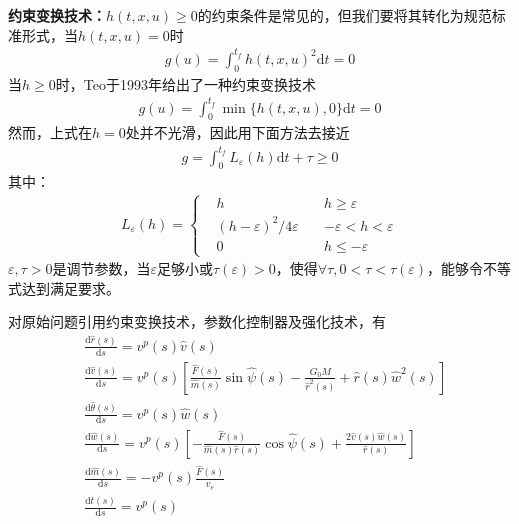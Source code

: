             \par
            \textbf{约束变换技术：}$h(t,x,u) \geqslant 0$的约束条件是常见的，但我们要将其转化为规范标准形式，当$h(t,x,u) = 0$时
            \begin{align*}
            g(u) = \int_0^{t_f}h(t,x,u)^2\mathrm{d}t = 0
            \end{align*}
            当$h \geqslant 0$时，Teo于1993年给出了一种约束变换技术
            \begin{align*}
            g(u) = \int_{0}^{t_f}\min\{h(t,x,u),0\}\mathrm{d}t =0
            \end{align*}
            然而，上式在$h=0$处并不光滑，因此用下面方法去接近
            \begin{align*}
            g = \int_{0}^{t_f} L_\varepsilon(h)\mathrm{d}t+\tau \geqslant 0
            \end{align*}
            其中：
            \begin{align*}
            L_{\varepsilon}(h) = \left\{
            \begin{aligned}
            & h\quad  &h \geqslant \varepsilon\\
            & (h-\varepsilon)^2/4\varepsilon\quad& -\varepsilon <h<\varepsilon\\
            & 0\quad &h \leqslant -\varepsilon
            \end{aligned}
            \right.
            \end{align*}
            $\varepsilon,\tau>0$是调节参数，当$\varepsilon$足够小或$\tau(\varepsilon)>0$，使得$\forall \tau,0<\tau<\tau(\varepsilon)$，能够令不等式达到满足要求。
            \par
            对原始问题引用约束变换技术，参数化控制器及强化技术，有
            \begin{align*}
            & \frac{\mathrm{d}\hat{r}(s)}{\mathrm{d}s} = v^p(s)\hat{v}(s)\\
            & \frac{\mathrm{d}\hat{v}(s)}{\mathrm{d}s} = v^p(s) \left[ \frac{\hat{F}(s)}{\hat{m}(s)}\sin \hat{\psi}(s)-\frac{G_0M}{\hat{r}^2(s)}+\hat{r}(s) \hat{w}^2(s)\right]\\
            & \frac{\mathrm{d}\hat{\theta}(s)}{\mathrm{d}s} = v^p(s)\hat{w}(s)\\
            & \frac{\mathrm{d}\hat{w}(s)}{\mathrm{d}s} = v^p(s) \left[- \frac{\hat{F}(s)}{\hat{m}(s)\hat{r}(s)}\cos \hat{\psi}(s)+\frac{2\hat{v}(s)\hat{w}(s)}{\hat{r}(s)}\right]\\
            & \frac{\mathrm{d}\hat{m}(s)}{\mathrm{d}s} = -v^p(s) \frac{\hat{F}(s)}{v_e}\\
            & \frac{\mathrm{d}t(s)}{\mathrm{d}s} = v^p(s)
            \end{align*}
